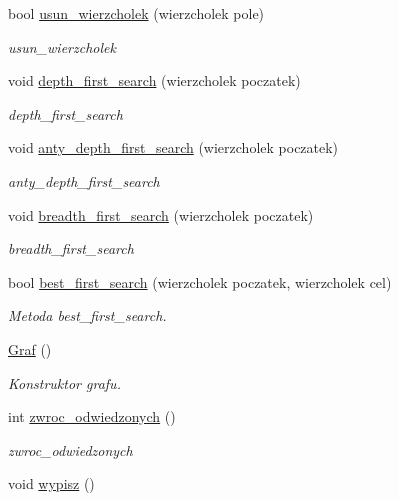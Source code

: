 \begin{DoxyCompactItemize}
bool \hyperlink{class_graf_afe4ec99c6fcbe71b27025573427773c6}{usun\+\_\+wierzcholek} (wierzcholek pole)
\begin{DoxyCompactList}\small\item\em usun\+\_\+wierzcholek \end{DoxyCompactList}\item 
void \hyperlink{class_graf_a7c1d929e180d33087ca774ce1c2c2ff5}{depth\+\_\+first\+\_\+search} (wierzcholek poczatek)
\begin{DoxyCompactList}\small\item\em depth\+\_\+first\+\_\+search \end{DoxyCompactList}\item 
void \hyperlink{class_graf_ab34f72112bc953a148e51eb479222797}{anty\+\_\+depth\+\_\+first\+\_\+search} (wierzcholek poczatek)
\begin{DoxyCompactList}\small\item\em anty\+\_\+depth\+\_\+first\+\_\+search \end{DoxyCompactList}\item 
void \hyperlink{class_graf_aee3970f1a56eb53223f30d0ae48ef612}{breadth\+\_\+first\+\_\+search} (wierzcholek poczatek)
\begin{DoxyCompactList}\small\item\em breadth\+\_\+first\+\_\+search \end{DoxyCompactList}\item 
bool \hyperlink{class_graf_a5f22ab605f2d4dffb0ab8240237ea978}{best\+\_\+first\+\_\+search} (wierzcholek poczatek, wierzcholek cel)
\begin{DoxyCompactList}\small\item\em Metoda best\+\_\+first\+\_\+search. \end{DoxyCompactList}\item 
\hyperlink{class_graf_abc168cfda60ca1af9ea6b519b368cdcb}{Graf} ()
\begin{DoxyCompactList}\small\item\em Konstruktor grafu. \end{DoxyCompactList}\item 
int \hyperlink{class_graf_a06d0a3918059f517745474009d914300}{zwroc\+\_\+odwiedzonych} ()
\begin{DoxyCompactList}\small\item\em zwroc\+\_\+odwiedzonych \end{DoxyCompactList}\item 
void \hyperlink{class_graf_a4b4c691cb70c87ddd066840e397b7212}{wypisz} ()

\end{DoxyCompactItemize}
